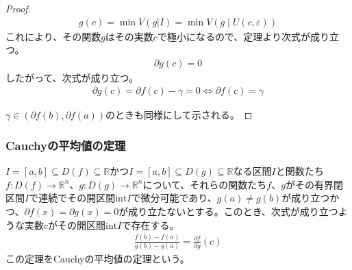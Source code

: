 \documentclass[dvipdfmx]{jsarticle}
\begin{document}
\begin{proof}
\begin{align*}
g(c) = \min{V\left( g|I \right)} = \min{V\left( g \middle| U(c,\varepsilon) \right)}
\end{align*}
これにより、その関数$g$はその実数$c$で極小になるので、定理より次式が成り立つ。
\begin{align*}
\partial g(c) = 0
\end{align*}
したがって、次式が成り立つ。
\begin{align*}
\partial g(c) = \partial f(c) - \gamma = 0 \Leftrightarrow \partial f(c) = \gamma
\end{align*}\par
$\gamma \in \left( \partial f(b),\partial f(a) \right)$のときも同様にして示される。
\end{proof}
\subsubsection{Cauchyの平均値の定理}%
\begin{thm}[Cauchyの平均値の定理]\label{4.2.2.11}
$I = [ a,b] \subseteq D(f) \subseteq \mathbb{R}$かつ$I = [ a,b] \subseteq D(g) \subseteq \mathbb{R}$なる区間$I$と関数たち$f:D(f) \rightarrow \mathbb{R}^{n}$、$g:D(g) \rightarrow \mathbb{R}^{n}$について、それらの関数たち$f$、$g$がその有界閉区間$I$で連続でその開区間$\mathrm{int}I$で微分可能であり、$g(a) \neq g(b)$が成り立つかつ、$\partial f(x) = \partial g(x) = 0$が成り立たないとする。このとき、次式が成り立つような実数$c$がその開区間$\mathrm{int}I$で存在する。
\begin{align*}
\frac{f(b) - f(a)}{g(b) - g(a)} = \frac{\partial f}{\partial g}(c)
\end{align*}
この定理をCauchyの平均値の定理という。
\end{thm}
\end{document}
